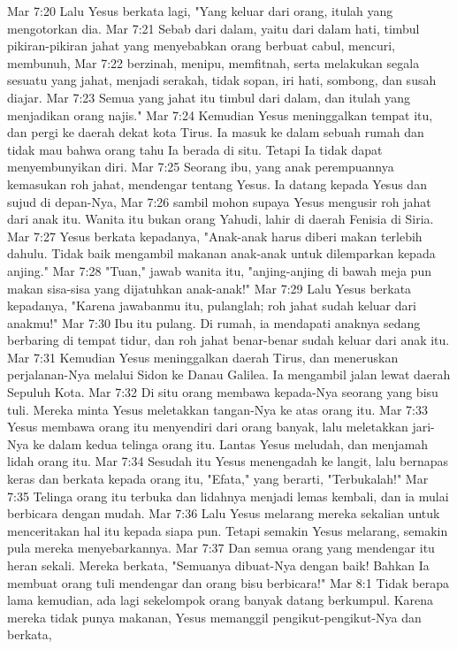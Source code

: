 Mar 7:20  Lalu Yesus berkata lagi, "Yang keluar dari orang, itulah yang mengotorkan dia.
Mar 7:21  Sebab dari dalam, yaitu dari dalam hati, timbul pikiran-pikiran jahat yang menyebabkan orang berbuat cabul, mencuri, membunuh,
Mar 7:22  berzinah, menipu, memfitnah, serta melakukan segala sesuatu yang jahat, menjadi serakah, tidak sopan, iri hati, sombong, dan susah diajar.
Mar 7:23  Semua yang jahat itu timbul dari dalam, dan itulah yang menjadikan orang najis."
Mar 7:24  Kemudian Yesus meninggalkan tempat itu, dan pergi ke daerah dekat kota Tirus. Ia masuk ke dalam sebuah rumah dan tidak mau bahwa orang tahu Ia berada di situ. Tetapi Ia tidak dapat menyembunyikan diri.
Mar 7:25  Seorang ibu, yang anak perempuannya kemasukan roh jahat, mendengar tentang Yesus. Ia datang kepada Yesus dan sujud di depan-Nya,
Mar 7:26  sambil mohon supaya Yesus mengusir roh jahat dari anak itu. Wanita itu bukan orang Yahudi, lahir di daerah Fenisia di Siria.
Mar 7:27  Yesus berkata kepadanya, "Anak-anak harus diberi makan terlebih dahulu. Tidak baik mengambil makanan anak-anak untuk dilemparkan kepada anjing."
Mar 7:28  "Tuan," jawab wanita itu, "anjing-anjing di bawah meja pun makan sisa-sisa yang dijatuhkan anak-anak!"
Mar 7:29  Lalu Yesus berkata kepadanya, "Karena jawabanmu itu, pulanglah; roh jahat sudah keluar dari anakmu!"
Mar 7:30  Ibu itu pulang. Di rumah, ia mendapati anaknya sedang berbaring di tempat tidur, dan roh jahat benar-benar sudah keluar dari anak itu.
Mar 7:31  Kemudian Yesus meninggalkan daerah Tirus, dan meneruskan perjalanan-Nya melalui Sidon ke Danau Galilea. Ia mengambil jalan lewat daerah Sepuluh Kota.
Mar 7:32  Di situ orang membawa kepada-Nya seorang yang bisu tuli. Mereka minta Yesus meletakkan tangan-Nya ke atas orang itu.
Mar 7:33  Yesus membawa orang itu menyendiri dari orang banyak, lalu meletakkan jari-Nya ke dalam kedua telinga orang itu. Lantas Yesus meludah, dan menjamah lidah orang itu.
Mar 7:34  Sesudah itu Yesus menengadah ke langit, lalu bernapas keras dan berkata kepada orang itu, "Efata," yang berarti, "Terbukalah!"
Mar 7:35  Telinga orang itu terbuka dan lidahnya menjadi lemas kembali, dan ia mulai berbicara dengan mudah.
Mar 7:36  Lalu Yesus melarang mereka sekalian untuk menceritakan hal itu kepada siapa pun. Tetapi semakin Yesus melarang, semakin pula mereka menyebarkannya.
Mar 7:37  Dan semua orang yang mendengar itu heran sekali. Mereka berkata, "Semuanya dibuat-Nya dengan baik! Bahkan Ia membuat orang tuli mendengar dan orang bisu berbicara!"
Mar 8:1  Tidak berapa lama kemudian, ada lagi sekelompok orang banyak datang berkumpul. Karena mereka tidak punya makanan, Yesus memanggil pengikut-pengikut-Nya dan berkata,
